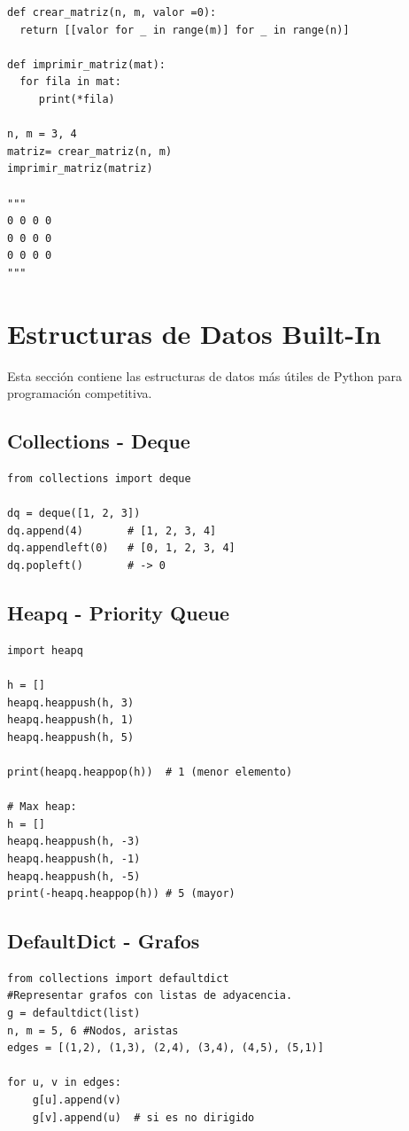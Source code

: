 \documentclass{article}
\begin{document}
\begin{lstlisting}[style=pythonstyle]
def crear_matriz(n, m, valor =0):
  return [[valor for _ in range(m)] for _ in range(n)]

def imprimir_matriz(mat):
  for fila in mat:
     print(*fila)

n, m = 3, 4
matriz= crear_matriz(n, m)
imprimir_matriz(matriz)

"""
0 0 0 0
0 0 0 0
0 0 0 0
"""

\end{lstlisting}


\section{Estructuras de Datos Built-In}

Esta sección contiene las estructuras de datos más útiles de Python para programación competitiva.

\subsection{Collections - Deque}

\begin{lstlisting}[style=pythonstyle]
from collections import deque

dq = deque([1, 2, 3])
dq.append(4)       # [1, 2, 3, 4]
dq.appendleft(0)   # [0, 1, 2, 3, 4]
dq.popleft()       # -> 0
\end{lstlisting}

\subsection{Heapq - Priority Queue}

\begin{lstlisting}[style=pythonstyle]
import heapq

h = []
heapq.heappush(h, 3)
heapq.heappush(h, 1)
heapq.heappush(h, 5)

print(heapq.heappop(h))  # 1 (menor elemento)

# Max heap:
h = []
heapq.heappush(h, -3)
heapq.heappush(h, -1)
heapq.heappush(h, -5)
print(-heapq.heappop(h)) # 5 (mayor)
\end{lstlisting}

\subsection{DefaultDict - Grafos}

\begin{lstlisting}[style=pythonstyle]
from collections import defaultdict
#Representar grafos con listas de adyacencia.
g = defaultdict(list)
n, m = 5, 6 #Nodos, aristas
edges = [(1,2), (1,3), (2,4), (3,4), (4,5), (5,1)]

for u, v in edges:
    g[u].append(v)
    g[v].append(u)  # si es no dirigido
\end{lstlisting}
\end{document}
